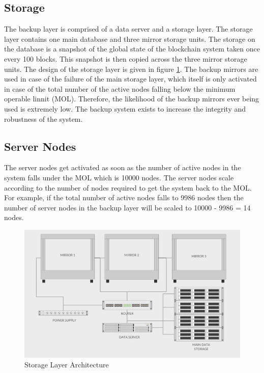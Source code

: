 \documentclass[a4paper,twoside,phd]{BYUPhys}
\begin{document}
\subsection{Storage}
The backup layer is comprised of a data server and a storage layer. The storage layer contains one main database and three mirror storage units. The storage on the database is a snapshot of the global state of the blockchain system taken once every 100 blocks. This snapshot is then copied across the three mirror storage units. The design of the storage layer is given in figure \ref{storagelayer}. The backup mirrors are used in case of the failure of the main storage layer, which itself is only activated in case of the total number of the active nodes falling below the minimum operable linnit (MOL). Therefore, the likelihood of the backup mirrors ever being used is extremely low. The backup system exists to increase the integrity and robustness of the system.

\subsection{Server Nodes}
The server nodes get activated as soon as the number of active nodes in the system falls under the MOL which is 10000 nodes. The server nodes scale according to the number of nodes required to get the system back to the MOL. For example, if the total number of active nodes falls to 9986 nodes then the number of server nodes in the backup layer will be scaled to 10000 - 9986 = 14 nodes.
\begin{figure}
  \includegraphics[width=\linewidth]{storage_layer.png}
  \caption{Storage Layer Architecture}
  \label{storagelayer}
\end{figure}
\end{document}
